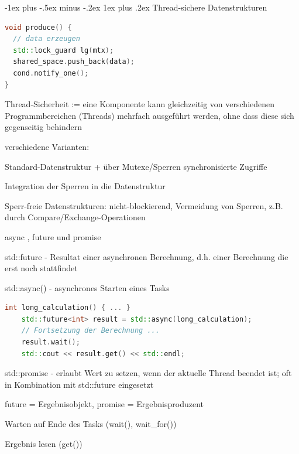 \documentclass[10pt]{article}
\makeatletter
\renewcommand{\subsubsection}{\@startsection{subsubsection}{3}{0mm}%
                                {-1ex plus -.5ex minus -.2ex}%
                                {1ex plus .2ex}%
                                {\normalfont\small\bfseries}}
\makeatother
\begin{document}
\subsubsection{Thread-sichere Datenstrukturen}
\begin{lstlisting}[language=C++]
void produce() {
  // data erzeugen
  std::lock_guard lg(mtx);
  shared_space.push_back(data);
  cond.notify_one();
}
\end{lstlisting}
\begin{itemize*}
  \item Thread-Sicherheit := eine Komponente kann gleichzeitig von verschiedenen Programmbereichen (Threads) mehrfach ausgeführt werden, ohne dass diese sich gegenseitig behindern
  \item verschiedene Varianten:
  \begin{itemize*}
    \item Standard-Datenstruktur + über Mutexe/Sperren synchronisierte Zugriffe
    \item Integration der Sperren in die Datenstruktur
    \item Sperr-freie Datenstrukturen: nicht-blockierend, Vermeidung von Sperren, z.B. durch Compare/Exchange-Operationen
  \end{itemize*}
  \item async , future und promise
  \item std::future - Resultat einer asynchronen Berechnung, d.h. einer Berechnung die erst noch stattfindet
  \item std::async() - asynchrones Starten eines Tasks
  \begin{lstlisting}[language=C++]
    int long_calculation() { ... }
    std::future<int> result = std::async(long_calculation);
    // Fortsetzung der Berechnung ...
    result.wait();
    std::cout << result.get() << std::endl;
  \end{lstlisting}
  \item std::promise - erlaubt Wert zu setzen, wenn der aktuelle Thread beendet ist; oft in Kombination mit std::future eingesetzt
  \item future = Ergebnisobjekt, promise = Ergebnisproduzent
  \begin{itemize*}
    \item Warten auf Ende des Tasks (wait(), wait\_for())
    \item Ergebnis lesen (get())
  \end{itemize*}
\end{itemize*}
\end{document}
